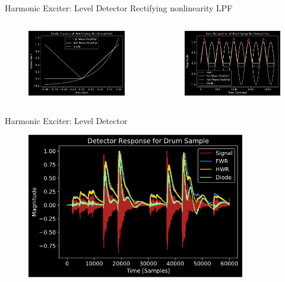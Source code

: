 \begin{frame}{Harmonic Exciter: Level Detector}
    Rectifying nonlinearity \rightarrow LPF
    \begin{columns}
        \begin{column}{0.5\linewidth}
            \begin{figure}
                \centering
                \includegraphics[width=2in]{../Exciter/Pics/rect_static}
            \end{figure}
        \end{column}
        \begin{column}{0.5\linewidth}
            \begin{figure}
                \centering
                \includegraphics[width=2in]{../Exciter/Pics/rect_sine}
            \end{figure}
        \end{column}
    \end{columns}
\end{frame}

\begin{frame}{Harmonic Exciter: Level Detector}
    \begin{figure}
        \centering
        \includegraphics[height=2.5in]{../Exciter/Pics/Waveform_Detected.png}
    \end{figure}
\end{frame}

